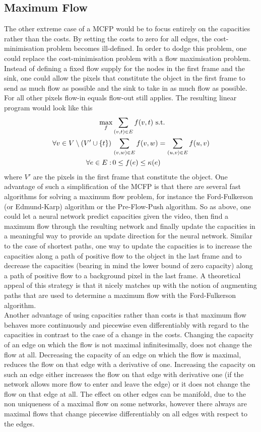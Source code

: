 \documentclass{article}
\begin{document}
\subsection{Maximum Flow}
The other extreme case of a MCFP would be to focus entirely on the capacities rather than the costs. By setting the costs to zero for all edges, the cost-minimisation problem becomes ill-defined. In order to dodge this problem, one could replace the cost-minimisation problem with a flow maximisation problem. Instead of defining a fixed flow supply for the nodes in the first frame and the sink, one could allow the pixels that constitute the object in the first frame to send as much flow as possible and the sink to take in as much flow as possible. For all other pixels flow-in equals flow-out still applies. The resulting linear program would look like this 
\begin{align}\label{MFP}
\max_f &\sum_{(v,t) \in E} f(v,t) \textnormal{ s.t.}\nonumber\\
\forall v \in V\setminus\left(V' \cup \{ t\}\right) \, & \sum_{(v,w) \in E} f(v,w) = \sum_{(u,v) \in E} f(u,v) \\
\forall	e \in E: \, & 0 \leq f(e) \leq \kappa(e) \nonumber
\end{align} 
where $V'$ are the pixels in the first frame that constitute the object. One advantage of such a simplification of the MCFP is that there are several fast algorithms for solving a maximum flow problem, for instance the Ford-Fulkerson (or Edmund-Karp) algorithm or the Pre-Flow-Push algorithm. So as above, one could let a neural network predict capacities given the video, then find a maximum flow through the resulting network and finally update the capacities in a meaningful way to provide an update direction for the neural network. Similar to the case of shortest paths, one way to update the capacities is to increase the capacities along a path of positive flow to the object in the last frame and to decrease the capacities (bearing in mind the lower bound of zero capacity) along a path of positive flow to a background pixel in the last frame. A theoretical appeal of this strategy is that it nicely matches up with the notion of augmenting paths that are used to determine a maximum flow with the Ford-Fulkerson algorithm.\\
Another advantage of using capacities rather than costs is that maximum flow behaves more continuously and piecewise even differentiably with regard to the capacities in contrast to the case of a change in the costs. Changing the capacity of an edge on which the flow is not maximal infinitesimally, does not change the flow at all. Decreasing the capacity of an edge on which the flow is maximal, reduces the flow on that edge with a derivative of one. Increasing the capacity on such an edge either increases the flow on that edge with derivative one (if the network allows more flow to enter and leave the edge) or it does not change the flow on that edge at all. The effect on other edges can be manifold, due to the non uniqueness of a maximal flow on some networks, however there always are maximal flows that change piecewise differentiably on all edges with respect to the edges. \\
\end{document}
